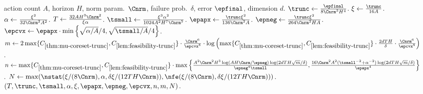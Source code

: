 \documentclass[11pt, oneside]{article}
\theoremstyle{plain}
\theoremstyle{definition}
\numberwithin{theorem}{section}
\renewcommand{\^}[1]{^{(#1)}}
\begin{document}
\begin{algorithm}
  \caption{$\Paramst(A,H,\Cnrm,\delta,\epfinal,d)$: Para\textbf{ME}ter \textbf{S}etting\textbf{S} for \SLMt} 
  \label{alg:slm-params}
  \begin{algorithmic}[1]\onehalfspacing
    \Require action count $A$, horizon $H$, norm param.~$\Cnrm$, failure prob.~$\delta$, error $\epfinal$, dimension $d$.%
    \State $\trunc \gets \frac{\epfinal}{8\Cnrm^3 H^4}$.
    \State $\xi \gets \frac{\trunc}{16A}$.
    \State $\alpha \gets \frac{\xi^2}{32\Cnrm^2 A^2}$. 
    \State $T \gets \frac{32AH^3\Cnrm^2}{\xi\alpha}$. 
    \State $\tsmall \gets \frac{\xi^3\alpha^2}{1024A^2H^7\Cnrm^5}$. %
    \State $\epapx \gets \frac{\trunc\xi^2}{136\Cnrm^2A}$.
    \State $\epneg \gets \frac{\trunc\xi^2}{264\Cnrm^2HA}$.
    \State $\epcvx \gets \epapx \cdot \min \left\{ \sqrt{\alpha/A}/4, \sqrt{\tsmall/A}/4 \right\}$. 
    \State $m \gets 2\max\{C_{\ref{thm:mu-coreset-trunc}},C_{\ref{lem:feasibility-trunc}}\} \cdot \frac{\Cnrm^6}{\epcvx^8}\cdot\log\left(\max\{C_{\ref{thm:mu-coreset-trunc}},C_{\ref{lem:feasibility-trunc}}\} \cdot \frac{2dTH}{\delta} \cdot \frac{\Cnrm^6}{\epcvx^8}\right)$.
    \State $n \gets \max\{C_{\ref{thm:mu-coreset-trunc}},C_{\ref{lem:feasibility-trunc}}\} \cdot \max\left\{\frac{A^2 \Cnrm^2 H^3 \log(AH\Cnrm/\epneg) \log(2dTH\sqrt{m}/\delta)}{\epneg^4 \tsmall}, \frac{16\Cnrm^2 A^2 (\tsmall^{-2} + \alpha^{-2}) \log(2dTH\sqrt{m}/\delta)}{\epapx^4} \right\}$.
    \State $N \gets \max(\nstat(\xi/(8\Cnrm), \alpha, \delta\xi/(12TH\Cnrm)), \nfe(\xi/(8\Cnrm), \delta\xi/(12TH\Cnrm)))$.\label{line:define-N-trunc}
    \State \Return $(T, \trunc, \tsmall, \alpha, \xi, \epapx, \epneg, \epcvx, n,m,N)$.
    \end{algorithmic}


\end{algorithm}
\end{document}
